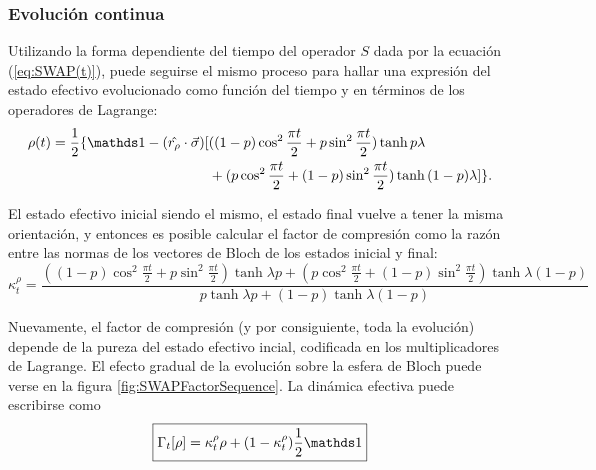 \subsubsection{Evolución continua}
Utilizando la forma dependiente del tiempo del operador $S$ dada por la ecuación (\ref{eq:SWAP(t)}), puede seguirse el mismo proceso para hallar una expresión del estado efectivo evolucionado como función del tiempo y en términos de los operadores de Lagrange:
\begin{align}
  \begin{split}
  \rho(t)=\frac{1}{2}\{\Id-(\hat{r_{\rho}}\cdot\vec{\sigma})[&((1-p)\cos^{2}{\frac{\pi t}{2}}+p\sin^{2}{\frac{\pi t}{2}})\tanh{p\lambda}\\
  &+(p\cos^{2}{\frac{\pi t}{2}}+(1-p)\sin^{2}{\frac{\pi t}{2}})\tanh{(1-p)\lambda}]\}.
  \end{split}
\end{align}

El estado efectivo inicial siendo el mismo, el estado final vuelve a tener la misma orientación, y entonces es posible calcular el factor de compresión como la razón entre las normas de los vectores de Bloch de los estados inicial y final:
\begin{equation}\label{eq:SWAPFactort}
  \kappa_{t}^{\rho}=\frac{((1-p)\cos^{2}{\frac{\pi t}{2}}+p\sin^{2}{\frac{\pi t}{2}})\tanh{\lambda p}+(p\cos^{2}{\frac{\pi t}{2}}+(1-p)\sin^{2}{\frac{\pi t}{2}})\tanh{\lambda (1-p)}}{
    p\tanh{\lambda p}+(1-p)\tanh{\lambda (1-p)}}
\end{equation}

Nuevamente, el factor de compresión (y por consiguiente, toda la evolución) depende de la pureza del estado efectivo incial, codificada en los multiplicadores de Lagrange. El efecto gradual de la evolución sobre la esfera de Bloch puede verse en la figura \ref{fig:SWAPFactorSequence}. La dinámica efectiva puede escribirse como
\begin{equation}\label{eq:EffectiveSWAPt}
  \boxed{\Gamma_{t}[\rho]=\kappa_{t}^{\rho}\rho+(1-\kappa_{t}^{\rho})\frac{1}{2}\Id}
\end{equation}

